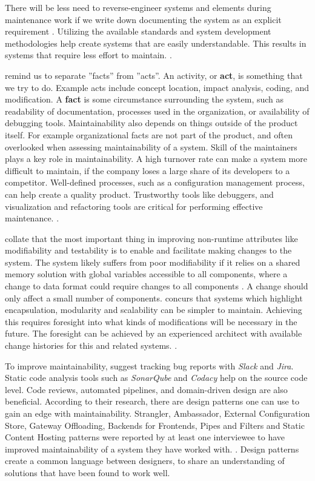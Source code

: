 \documentclass[utf8,english]{gradu3}
\begin{document}
There will be less need to reverse-engineer systems and elements during
maintenance work if we write down documenting the system as an explicit
requirement \parencite[96]{IEEE12207}. Utilizing the available standards and
system development methodologies help create systems that are easily
understandable.  This results in systems that require less effort to maintain.
\parencite[608]{Gorla2010}.

\textcite{Broy2006} remind us to separate ''facts'' from ''acts''. An activity,
or \textbf{act}, is something that we try to do. Example acts include concept
location, impact analysis, coding, and modification. A \textbf{fact} is some
circumstance surrounding the system, such as readability of documentation,
processes used in the organization, or availability of debugging tools.
Maintainability also depends on things outside of the product itself.  For
example organizational facts are not part of the product, and often overlooked
when assessing maintainability of a system. Skill of the maintainers plays a key
role in maintainability. A high turnover rate can make a system more difficult
to maintain, if the company loses a large share of its developers to a
competitor. Well-defined processes, such as a configuration management process,
can help create a quality product.  Trustworthy tools like debuggers, and
visualization and refactoring tools are critical for performing effective
maintenance. \parencite[25-26]{Broy2006}.

\textcite{Bass1998} collate that the most important thing in improving
non-runtime attributes like modifiability and testability is to enable and
facilitate making changes to the system. The system likely suffers from poor
modifiability if it relies on a shared memory solution with global variables
accessible to all components, where a change to data format could require
changes to all components \parencite[89]{Bass1998}. A change should only affect
a small number of components. \textcite[96]{IEEE12207} concurs that systems
which highlight encapsulation, modularity and scalability can be simpler to
maintain. Achieving this requires foresight into what kinds of modifications
will be necessary in the future. The foresight can be achieved by an experienced
architect with available change histories for this and related systems.
\parencite[118]{Bass1998}.

To improve maintainability, \textcite[7]{Vale2022} suggest tracking bug reports
with \textit{Slack} and \textit{Jira}. Static code analysis tools such as
\textit{SonarQube} and \textit{Codacy} help on the source code level. Code
reviews, automated pipelines, and domain-driven design are also beneficial.
According to their research, there are design patterns one can use to gain an
edge with maintainability. Strangler, Ambassador, External Configuration Store,
Gateway Offloading, Backends for Frontends, Pipes and Filters and Static Content
Hosting patterns were reported by at least one interviewee to have improved
maintainability of a system they have worked with. \parencite[4-6]{Vale2022}.
Design patterns create a common language between designers, to share an
understanding of solutions that have been found to work well.
\end{document}
